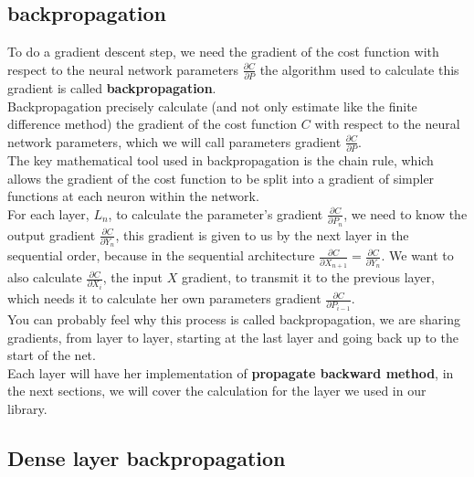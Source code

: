 \documentclass[a4paper, twocolumn, twoside]{article}
\begin{document}
	\subsection{backpropagation}
	To do a gradient descent step, we need the gradient of
	the cost function with respect to the neural network parameters $\frac{\partial C}{\partial P}$
	the algorithm used to calculate this gradient 
	is called \textbf{backpropagation}.\\
	Backpropagation precisely calculate
	(and not only estimate like the finite difference method) the gradient of the cost function $C$ with respect to the neural network parameters,
	which we will call parameters gradient $\frac{\partial C}{\partial P}$.\\
	The key mathematical tool used in backpropagation is the chain rule,
	which allows the gradient of the cost function
	to be split into a gradient of simpler functions at each neuron within the network.\\
	For each layer, $L_n$, to calculate the parameter's gradient $\frac{\partial C}{\partial P_n}$,
	we need to know the output gradient $\frac{\partial C}{\partial Y_n}$, this gradient is given to us by the next layer in the sequential order,
	because in the sequential architecture $\frac{\partial C}{\partial X_{n+1}} = \frac{\partial C}{\partial Y_n}$.
	We want to also calculate $\frac{\partial C}{\partial X_i}$, the input $X$ gradient,
	to transmit it to the previous layer, which needs it to calculate her own parameters gradient $\frac{\partial C}{\partial P_{i-1}}$.\\
	You can probably feel why this process is called backpropagation, we are sharing gradients,
	from layer to layer, starting at the last layer and going back up to the start of the net.\\
	Each layer will have her implementation of \textbf{propagate backward method},
	in the next sections, we will cover the calculation for the layer we used in our library.

	\subsection{Dense layer backpropagation}
\end{document}
